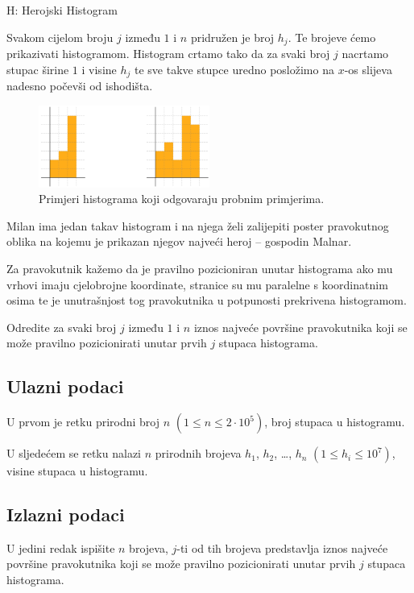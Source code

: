 \begin{statement}[
  timelimit=1 s,
  memorylimit=512 MiB,
]{H: Herojski Histogram}

Svakom cijelom broju $j$ između $1$ i $n$ pridružen je broj $h_j$. Te brojeve
ćemo prikazivati histogramom. Histogram crtamo tako da za svaki broj $j$
nacrtamo stupac širine $1$ i visine $h_j$ te sve takve stupce uredno posložimo
na $x$-os slijeva nadesno počevši od ishodišta.

\setlength{\belowcaptionskip}{-10pt}
\begin{figure}[H]
\centering
\includegraphics[width=0.5\textwidth]{pic/histogram.png}
\caption{Primjeri histograma koji odgovaraju probnim primjerima.}
\end{figure}

Milan ima jedan takav histogram i na njega želi zalijepiti poster pravokutnog
oblika na kojemu je prikazan njegov najveći heroj -- gospodin Malnar.

Za pravokutnik kažemo da je pravilno pozicioniran unutar histograma ako mu
vrhovi imaju cjelobrojne koordinate, stranice su mu paralelne s koordinatnim
osima te je unutrašnjost tog pravokutnika u potpunosti prekrivena histogramom.

Odredite za svaki broj $j$ između $1$ i $n$ iznos najveće površine pravokutnika
koji se može pravilno pozicionirati unutar prvih $j$ stupaca histograma.

\subsection*{Ulazni podaci}
U prvom je retku prirodni broj $n$ $(1 \le n \le 2 \cdot 10^5)$,  broj stupaca u
histogramu.

U sljedećem se retku nalazi $n$ prirodnih brojeva $h_1$, $h_2$, \dots, $h_n$
$(1 \le h_i \le 10^7)$, visine stupaca u histogramu.


\subsection*{Izlazni podaci}
U jedini redak ispišite $n$ brojeva, $j$-ti od tih brojeva predstavlja iznos
najveće površine pravokutnika koji se može pravilno pozicionirati unutar
prvih $j$ stupaca histograma.


\end{statement}

